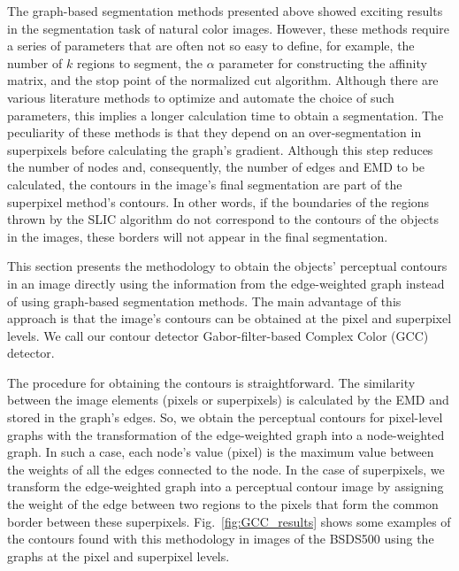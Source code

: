 The graph-based segmentation methods presented above showed exciting results in the segmentation task of natural color images. However, these methods require a series of parameters that are often not so easy to define, for example, the number of $k$ regions to segment, the $\alpha$ parameter for constructing the affinity matrix, and the stop point of the normalized cut algorithm. Although there are various literature methods to optimize and automate the choice of such parameters, this implies a longer calculation time to obtain a segmentation. The peculiarity of these methods is that they depend on an over-segmentation in superpixels before calculating the graph's gradient. Although this step reduces the number of nodes and, consequently, the number of edges and EMD to be calculated, the contours in the image's final segmentation are part of the superpixel method's contours. In other words, if the boundaries of the regions thrown by the SLIC algorithm do not correspond to the contours of the objects in the images, these borders will not appear in the final segmentation. 

This section presents the methodology to obtain the objects' perceptual contours in an image directly using the information from the edge-weighted graph instead of using graph-based segmentation methods. The main advantage of this approach is that the image's contours can be obtained at the pixel and superpixel levels. We call our contour detector Gabor-filter-based Complex Color (GCC) detector.

The procedure for obtaining the contours is straightforward. The similarity between the image elements (pixels or superpixels) is calculated by the EMD and stored in the graph's edges. So, we obtain the perceptual contours for pixel-level graphs with the transformation of the edge-weighted graph into a node-weighted graph. In such a case, each node's value (pixel) is the maximum value between the weights of all the edges connected to the node. In the case of superpixels, we transform the edge-weighted graph into a perceptual contour image by assigning the weight of the edge between two regions to the pixels that form the common border between these superpixels. Fig.\ \ref{fig:GCC_results} shows some examples of the contours found with this methodology in images of the BSDS500 using the graphs at the pixel and superpixel levels. 


